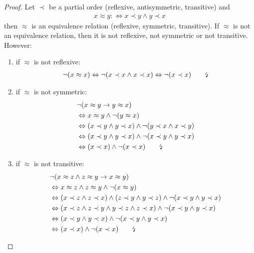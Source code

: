 \begin{proof}
Let $\prec$ be a partial order (reflexive, antisymmetric, transitive) and
\begin{align*}
x \approx y :\Leftrightarrow x \prec y \wedge y \prec x
\end{align*}
then $\approx$ is an equivalence relation (reflexive, symmetric, transitive).
If $\approx$ is not an equivalence relation, then it is not reflexive, not symmetric or not transitive.
However:
\begin{enumerate}
\item
if $\approx$ is not reflexive:
\begin{align*}
\neg(x \approx x) 
\Leftrightarrow
\neg(x \prec x \wedge x \prec x)
\Leftrightarrow
\neg(x \prec x)
\qquad\text{\lightning}
\end{align*}
\item
if $\approx$ is not symmetric:
\begin{align*}
&\neg(x \approx y \rightarrow y \approx x)
\\&\Leftrightarrow
x \approx y \wedge \neg(y \approx x)
\\&\Leftrightarrow
(x \prec y \wedge y \prec x) \wedge \neg(y \prec x \wedge x \prec y)
\\&\Leftrightarrow
(x \prec y \wedge y \prec x) \wedge \neg(x \prec y \wedge y \prec x)
\\&\Leftrightarrow
(x \prec x) \wedge \neg(x \prec x)
\qquad\text{\lightning}
\end{align*}
\item
if $\approx$ is not transitive:
\begin{align*}
&\neg(x \approx z \wedge z \approx y \rightarrow x \approx y)
\\&\Leftrightarrow
x \approx z \wedge z \approx y \wedge \neg(x \approx y)
\\&\Leftrightarrow
(x \prec z \wedge z \prec x) \wedge (z \prec y \wedge y \prec z) \wedge \neg(x \prec y \wedge y \prec x)
\\&\Leftrightarrow
(x \prec z \wedge z \prec y \wedge y \prec z \wedge z \prec x) \wedge \neg(x \prec y \wedge y \prec x)
\\&\Leftrightarrow
(x \prec y \wedge y \prec x) \wedge \neg(x \prec y \wedge y \prec x)
\\&\Leftrightarrow
(x \prec x) \wedge \neg(x \prec x)
\qquad\text{\lightning}
\end{align*}
\end{enumerate}
\end{proof}

